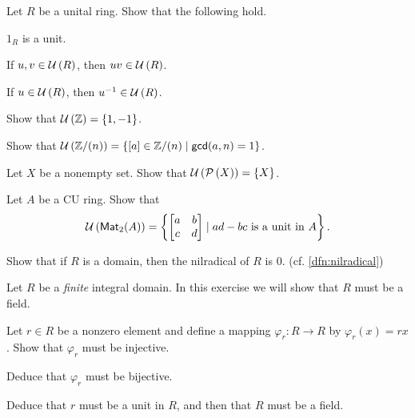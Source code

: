 \begin{exercise} \label{exerc:units-form-group}
Let \(R\) be a unital ring. Show that the following hold.
\begin{proplist*}
\item \(1_R\) is a unit.
\item If \(u, v \in  \mathcal{U}\left(R\right) \), then \(uv \in  \mathcal{U}\left(R\right) \).
\item If \(u \in  \mathcal{U}\left(R\right) \), then \(u^{-1} \in  \mathcal{U}\left(R\right) \).
\end{proplist*}
\end{exercise}

\begin{exercise}
Show that \( \mathcal{U}\left(\mathbb{Z}\right)  = \{ 1, -1 \}\).
\end{exercise}

\begin{exercise}
Show that \( \mathcal{U}\left(\mathbb{Z}/(n)\right)  = \{ [a] \in \mathbb{Z}/(n) \mid \mathsf{gcd}(a, n) = 1 \}\).
\end{exercise}

\begin{exercise}
Let \(X\) be a nonempty set. Show that \( \mathcal{U}\left(\mathcal{P}\left(X\right)\right)  = \{X\}\).
\end{exercise}

\begin{exercise}
Let \(A\) be a CU ring. Show that \[  \mathcal{U}\left(\mathsf{Mat}_{2}(A)\right)  = \left\{ \begin{bmatrix} a & b \\ c & d \end{bmatrix} \mid ad - bc\ \mathrm{is\ a\ unit\ in}\ A \right\}. \]
\end{exercise}

\begin{exercise}
Show that if \(R\) is a domain, then the nilradical of \(R\) is \(0\). (cf. \autoref{dfn:nilradical})
\end{exercise}

\begin{exercise}
Let \(R\) be a \emph{finite} integral domain. In this exercise we will show that \(R\) must be a field.
\begin{proplist}
\item Let \(r \in R\) be a nonzero element and define a mapping \(\varphi_r : R \rightarrow R\) by \(\varphi_r(x) = rx\). Show that \(\varphi_r\) must be injective.
\item Deduce that \(\varphi_r\) must be bijective.
\item Deduce that \(r\) must be a unit in \(R\), and then that \(R\) must be a field.
\end{proplist}
\end{exercise}

